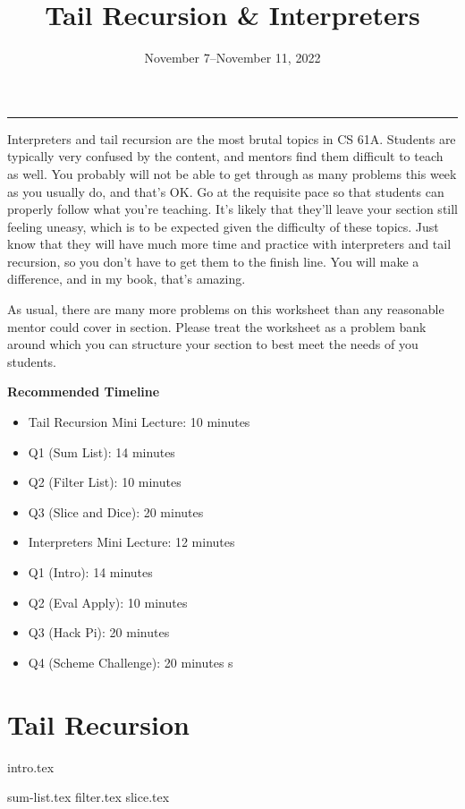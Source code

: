 \documentclass{exam}
\title{Tail Recursion \& Interpreters}
\date{November 7--November 11, 2022}
\begin{document}
\maketitle
\rule{\textwidth}{0.15em}

\begin{meta}
    Interpreters and tail recursion are the most brutal topics in CS 61A.
    Students are typically very confused by the content, and mentors find them difficult to
    teach as well. You probably will not be able to get through as many problems this
    week as you usually do, and that's OK. Go at the requisite pace so that students
    can properly follow what you're teaching. It's likely that they'll leave your 
    section still feeling uneasy, which is to be expected given the difficulty
    of these topics. Just know that they will have much more time and practice with
    interpreters and tail recursion, so you don't have to get them to the finish line.
    You will make a difference, and in my book, that's amazing. 

    As usual, there are many more problems on this worksheet than any reasonable mentor
    could cover in section. Please treat the worksheet as a problem bank around which
    you can structure your section to best meet the needs of you students. 

    \textbf{Recommended Timeline}
    \begin{itemize}
        \item Tail Recursion Mini Lecture: 10 minutes
        \item Q1 (Sum List): 14 minutes
        \item Q2 (Filter List): 10 minutes
        \item Q3 (Slice and Dice): 20 minutes
        \item Interpreters Mini Lecture: 12 minutes
        \item Q1 (Intro): 14 minutes
        \item Q2 (Eval Apply): 10 minutes
        \item Q3 (Hack Pi): 20 minutes
        \item Q4 (Scheme Challenge): 20 minutes
s    \end{itemize}
\newpage
\end{meta}

\section{Tail Recursion}
{intro.tex}
\vspace{1in}
\begin{questions}
    {sum-list.tex}
    {filter.tex}
    {slice.tex}
\end{questions}
\end{document}
